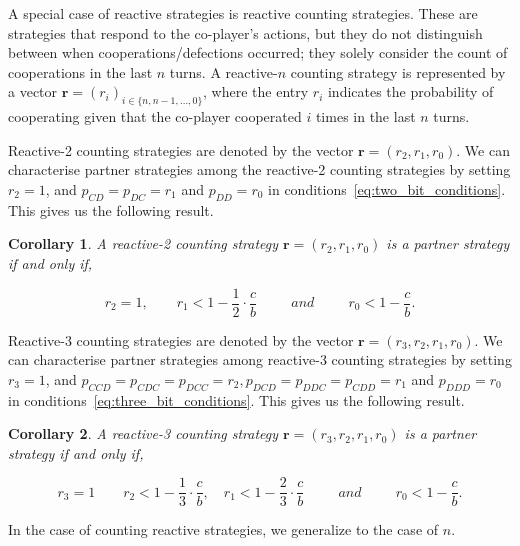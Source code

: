 \documentclass[11pt]{article}
\theoremstyle{plainCl1}
\newtheorem{corollary}{Corollary}
\theoremstyle{plainCl2}
\begin{document}
A special case of reactive strategies is reactive counting strategies. These are
strategies that respond to the co-player's actions, but they do not distinguish
between when cooperations/defections occurred; they solely consider the count of
cooperations in the last $n$ turns. A reactive-$n$ counting strategy is represented
by a vector $\mathbf{r}=(r_i)_{i \in \{n, n -1, \dots, 0\}}$, where the entry \(r_i\)
indicates the probability of cooperating given that the co-player cooperated
\(i\) times in the last \(n\) turns.

Reactive-2 counting strategies are denoted by the vector $\mathbf{r}=(r_2,
r_1, r_0)$. We can characterise partner strategies among the reactive-2
counting strategies by setting $r_2 = 1$, and $p_{CD} = p_{DC} = r_1$ and
$p_{DD} = r_0$ in conditions~\eqref{eq:two_bit_conditions}. This gives us the
following result.

\begin{corollary}
A reactive-2 counting strategy $\mathbf{r} = (r_2, r_1, r_0)$ is a partner strategy if and only if,

\begin{equation}\label{eq:counting_two_bit_conditions}
  \displaystyle r_2 = 1, \qquad r_1 < 1-\frac{1}{2} \cdot \frac{c}{b} \qquad ~~and~~ \qquad r_0 < 1\!-\! \frac{c}{b}.
\end{equation}
\end{corollary}

Reactive-3 counting strategies are denoted by the vector $\mathbf{r}=(r_3,
r_2, r_1, r_0)$. We can characterise partner strategies among reactive-3
counting strategies by setting $r_3 = 1$, and $p_{CCD} = p_{CDC} = p_{DCC} =
r_2, p_{DCD} = p_{DDC} = p_{CDD} = r_1$ and $p_{DDD} = r_0$ in
conditions~\eqref{eq:three_bit_conditions}. This gives us the following result.

\begin{corollary}
A reactive-3 counting strategy $\mathbf{r} = (r_3, r_2, r_1, r_0)$ is a partner strategy if and only if,

\begin{equation}\label{eq:counting_three_bit_conditions}
  \displaystyle r_3 = 1 \qquad r_2 < 1- \frac{1}{3} \cdot \frac{c}{b}, \quad r_1 < 1- \frac{2}{3} \cdot \frac{c}{b} \qquad ~~and~~ \qquad r_0 < 1\!-\! \frac{c}{b}.
\end{equation}
\end{corollary}

In the case of counting reactive strategies, we generalize to the case of $n$.
\end{document}
